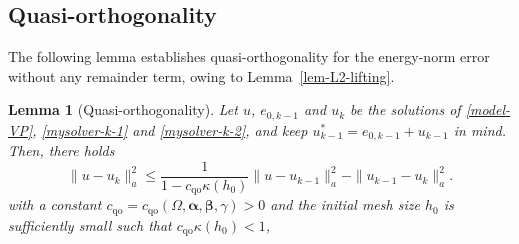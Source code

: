 \documentclass[preprint,times]{elsarticle}%
\newtheorem{lemma}{Lemma}[section]
\numberwithin{algorithm}{section}
\numberwithin{equation}{section}
\newcommand{\qoo}{\mathrm{qo}}
\newcommand{\anorm}[1]{\|#1\|_a}
\newcommand{\valpha}{\boldsymbol{\alpha}}
\newcommand{\vbeta}{\boldsymbol{\beta}}
\def\leq{\leqslant}
\begin{document}
\subsection{Quasi-orthogonality}
The following lemma establishes quasi-orthogonality for the energy-norm error without any remainder term, owing to Lemma~\ref{lem-L2-lifting}.
\begin{lemma}[Quasi-orthogonality]\label{lem-quasi-orth}
	Let $u$, $e_{0,k-1}$ and $u_k$ be the solutions of \eqref{model-VP}, \eqref{mysolver-k-1} and \eqref{mysolver-k-2}, and keep $u_{k-1}^*=e_{0,k-1} + u_{k-1}$ in mind. 
	Then, there holds
	\begin{equation}\label{result-quasi-orth}
		\anorm{u-u_k}^2 \leq \dfrac{1}{1-c_\qoo \kappa(h_0)} \anorm{u-u_{k-1}}^2 - \anorm{u_{k-1}-u_k}^2.  
	\end{equation}
with a constant $c_\qoo = c_\qoo(\Omega,\valpha,\vbeta,\gamma)> 0$ and the initial mesh size $h_0$ is sufficiently small such that $c_\qoo \kappa(h_0) < 1$, 
\end{lemma}
\end{document}
